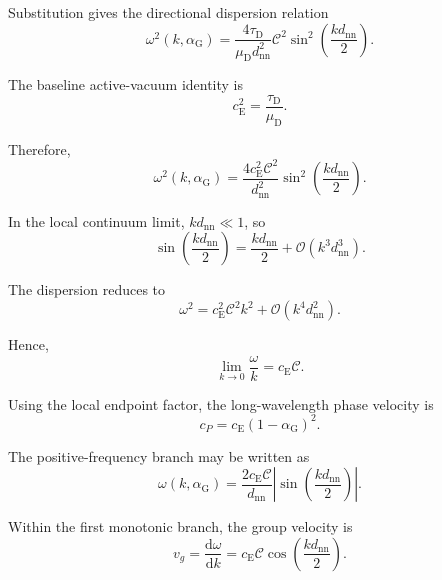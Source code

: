 Substitution gives the directional dispersion relation
\begin{equation}
    \omega^2(k,\alpha_{\mathrm{G}}) = \frac{4\tau_{\mathrm{D}}}{\mu_{\mathrm{D}}d_{\mathrm{nn}}^2} \mathcal{C}^2 \sin^2\left(\frac{kd_{\mathrm{nn}}}{2}\right).
\end{equation}

The baseline active-vacuum identity is
\begin{equation}
    c_{\mathrm{E}}^2 = \frac{\tau_{\mathrm{D}}}{\mu_{\mathrm{D}}}.
\end{equation}

Therefore,
\begin{equation}
    \boxed{ \omega^2(k,\alpha_{\mathrm{G}}) = \frac{4c_{\mathrm{E}}^2\mathcal{C}^2}{d_{\mathrm{nn}}^2} \sin^2\left(\frac{kd_{\mathrm{nn}}}{2}\right) }.
\end{equation}

In the local continuum limit, $kd_{\mathrm{nn}} \ll 1$, so
\begin{equation}
    \sin\left(\frac{kd_{\mathrm{nn}}}{2}\right) = \frac{kd_{\mathrm{nn}}}{2} + \mathcal{O}(k^3d_{\mathrm{nn}}^3).
\end{equation}

The dispersion reduces to
\begin{equation}
    \omega^2 = c_{\mathrm{E}}^2\mathcal{C}^2 k^2 + \mathcal{O}(k^4d_{\mathrm{nn}}^2).
\end{equation}

Hence,
\begin{equation}
    \lim_{k\rightarrow0}\frac{\omega}{k} = c_{\mathrm{E}}\mathcal{C}.
\end{equation}

Using the local endpoint factor, the long-wavelength phase velocity is
\begin{equation}
    \boxed{ c_P = c_{\mathrm{E}}(1-\alpha_{\mathrm{G}})^2 }.
\end{equation}

The positive-frequency branch may be written as
\begin{equation}
    \omega(k,\alpha_{\mathrm{G}}) = \frac{2c_{\mathrm{E}}\mathcal{C}}{d_{\mathrm{nn}}} \left| \sin\left(\frac{kd_{\mathrm{nn}}}{2}\right) \right|.
\end{equation}

Within the first monotonic branch, the group velocity is
\begin{equation}
    v_g = \frac{\mathrm{d}\omega}{\mathrm{d}k} = c_{\mathrm{E}}\mathcal{C} \cos\left(\frac{kd_{\mathrm{nn}}}{2}\right).
\end{equation}

